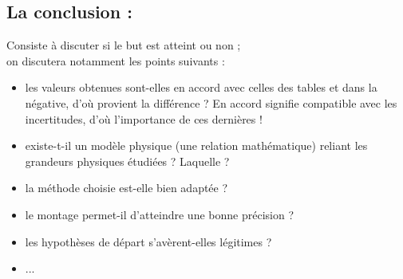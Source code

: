 \subsection{La conclusion : }
Consiste à discuter si le but est atteint ou non ;\\
on discutera notamment les points suivants :
\begin{itemize}
    \item les valeurs obtenues sont-elles en accord avec celles des tables et dans la négative, d'où provient la différence ? En accord signifie compatible avec les incertitudes, d'où  l'importance de ces dernières !
    \item existe-t-il un modèle physique (une relation mathématique) reliant les grandeurs physiques étudiées ? Laquelle ?
    \item la méthode choisie est-elle bien adaptée ?
    \item le montage permet-il  d'atteindre une bonne précision ?
    \item les hypothèses de départ s'avèrent-elles légitimes ?
    \item ...
\end{itemize}